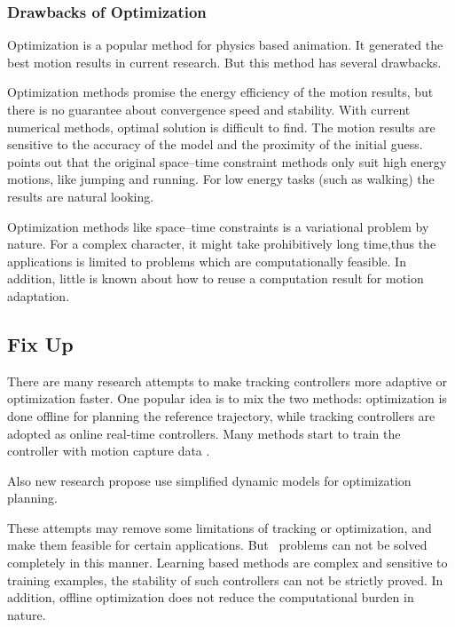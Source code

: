 \subsubsection*{Drawbacks of Optimization}
Optimization is a popular method for physics based animation.
It generated the best motion results in current research.
But this method has several drawbacks.

\begin{itemize}
Optimization methods promise the energy efficiency of the  motion results, but there is no guarantee about convergence speed and stability.
With current numerical methods, optimal solution is difficult to find. 
The motion results are sensitive to the accuracy of the model and the proximity of the initial guess.
\citet{Liu2005} points out that the original space–time constraint methods only suit high energy motions, like jumping and running.
For low energy tasks (such as walking) the results are natural looking.

Optimization methods like space–time constraints is a variational problem by nature. 
For a complex character, it might take  prohibitively long time,thus the applications is limited  to problems which are computationally feasible. 
In addition, little is known about how to reuse a computation result for motion adaptation.
\end{itemize}


\subsection{Fix Up}
There are many research attempts to make tracking controllers more adaptive or optimization faster.
One popular idea is to mix the two methods: optimization is done offline for planning the reference trajectory, while tracking controllers are adopted as online real-time controllers.
Many methods start to train the controller with motion capture data \citep{levine2011space,coros2010generalized,de2010feature,wei2011physically,ye2010optimal,lee2010motion,wang2010optimizing,wu2010terrain,liu2010sampling,lee2010data}. 

Also new research propose use simplified dynamic models for optimization planning\citep{mordatch2010robust}.


These attempts may remove some limitations of tracking or optimization, and make them feasible for certain applications.
But \cms\ problems can not be solved completely in this manner.
Learning based methods are complex and  sensitive to training examples, the stability of such controllers can not be strictly proved.
In addition,  offline optimization  does not reduce the computational burden in nature.




